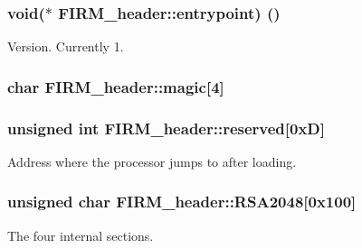 \subsubsection[{entrypoint}]{\setlength{\rightskip}{0pt plus 5cm}void($\ast$ F\+I\+R\+M\+\_\+header\+::entrypoint) ()}\label{struct_f_i_r_m__header_ad1612a664851fdd7f9ca671af2bfc431}


Version. Currently 1. 

\hypertarget{struct_f_i_r_m__header_a2d27c5c398bee211d2410fbdbaa5a05e}{}
\subsubsection[{magic}]{\setlength{\rightskip}{0pt plus 5cm}char F\+I\+R\+M\+\_\+header\+::magic\mbox{[}4\mbox{]}}\label{struct_f_i_r_m__header_a2d27c5c398bee211d2410fbdbaa5a05e}
\hypertarget{struct_f_i_r_m__header_adc471470dba61f85b71e72ee4d84d73e}{}
\subsubsection[{reserved}]{\setlength{\rightskip}{0pt plus 5cm}unsigned int F\+I\+R\+M\+\_\+header\+::reserved\mbox{[}0x\+D\mbox{]}}\label{struct_f_i_r_m__header_adc471470dba61f85b71e72ee4d84d73e}


Address where the processor jumps to after loading. 

\hypertarget{struct_f_i_r_m__header_a7be52a7b7994c1013d02e2e9e523316b}{}
\subsubsection[{R\+S\+A2048}]{\setlength{\rightskip}{0pt plus 5cm}unsigned char F\+I\+R\+M\+\_\+header\+::\+R\+S\+A2048\mbox{[}0x100\mbox{]}}\label{struct_f_i_r_m__header_a7be52a7b7994c1013d02e2e9e523316b}


The four internal sections. 

\hypertarget{struct_f_i_r_m__header_a685b6a1c1a0cfb8fb0f1dfcba06b9741}{}
